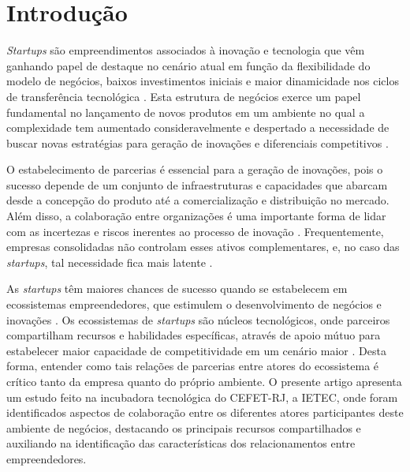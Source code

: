 \documentclass{sig-alternate-05-2015}
\begin{document}


%
%

%
%
\printccsdesc



\section{Introdução}
\textit{Startups} são empreendimentos associados à inovação e tecnologia que vêm ganhando papel de destaque no cenário atual em função da flexibilidade do modelo de negócios, baixos investimentos iniciais e maior dinamicidade nos ciclos de transferência tecnológica \cite{ries-2011}. Esta estrutura de negócios exerce  um papel fundamental no lançamento de novos produtos em um ambiente no qual a complexidade tem aumentado consideravelmente e despertado a necessidade de buscar novas estratégias para geração de inovações e diferenciais competitivos \cite{hardwick-et-al-2013}.

O estabelecimento de parcerias é essencial para a geração de inovações, pois o sucesso depende de um conjunto de infraestruturas e capacidades que abarcam desde a concepção do produto até a comercialização e distribuição no mercado. Além disso, a colaboração entre organizações é uma importante forma de lidar com as incertezas e riscos inerentes ao processo de inovação \cite{chesbrough-appleyard-2007, west-bogers-2014}. Frequentemente, empresas consolidadas não controlam esses ativos complementares, e, no caso das \textit{startups}, tal necessidade fica mais latente \cite{candido-souza-15}. 

As \textit{startups} têm maiores chances de sucesso quando se estabelecem em ecossistemas empreendedores, que estimulem o desenvolvimento de negócios e inovações \cite{spigel-2015}. Os ecossistemas de \textit{startups} são núcleos tecnológicos, onde parceiros compartilham recursos e habilidades específicas, através de apoio mútuo para estabelecer maior capacidade de competitividade em um cenário maior \cite{cukier-et-al-2015}. Desta forma, entender como tais relações de parcerias entre atores do ecossistema é crítico tanto da empresa quanto do próprio ambiente. O presente artigo apresenta um estudo feito na incubadora tecnológica do CEFET-RJ, a IETEC, onde foram identificados aspectos de colaboração entre os diferentes atores participantes deste ambiente de negócios, destacando os principais recursos compartilhados e auxiliando na identificação das características dos relacionamentos entre empreendedores. 
\end{document}
